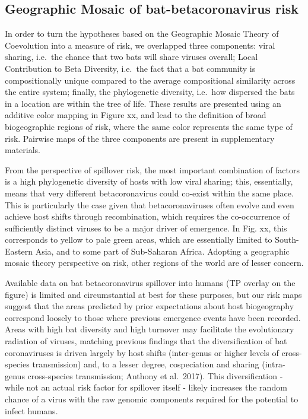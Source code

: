 \documentclass[11pt]{article}
\begin{document}
\hypertarget{geographic-mosaic-of-bat-betacoronavirus-risk}{%
\subsection{Geographic Mosaic of bat-betacoronavirus
risk}\label{geographic-mosaic-of-bat-betacoronavirus-risk}}

In order to turn the hypotheses based on the Geographic Mosaic Theory of
Coevolution into a measure of risk, we overlapped three components:
viral sharing, i.e.~the chance that two bats will share viruses overall;
Local Contribution to Beta Diversity, i.e.~the fact that a bat community
is compositionally unique compared to the average compositional
similarity across the entire system; finally, the phylogenetic
diversity, i.e.~how dispersed the bats in a location are within the tree
of life. These results are presented using an additive color mapping in
Figure xx, and lead to the definition of broad biogeographic regions of
risk, where the same color represents the same type of risk. Pairwise
maps of the three components are present in supplementary materials.

From the perspective of spillover risk, the most important combination
of factors is a high phylogenetic diversity of hosts with low viral
sharing; this, essentially, means that very different betacoronavirus
could co-exist within the same place. This is particularly the case
given that betacoronaviruses often evolve and even achieve host shifts
through recombination, which requires the co-occurrence of sufficiently
distinct viruses to be a major driver of emergence. In Fig. xx, this
corresponds to yellow to pale green areas, which are essentially limited
to South-Eastern Asia, and to some part of Sub-Saharan Africa. Adopting
a geographic mosaic theory perspective on risk, other regions of the
world are of lesser concern.

Available data on bat betacoronavirus spillover into humans (TP overlay
on the figure) is limited and circumstantial at best for these purposes,
but our risk maps suggest that the areas predicted by prior expectations
about host biogeography correspond loosely to those where previous
emergence events have been recorded. Areas with high bat diversity and
high turnover may facilitate the evolutionary radiation of viruses,
matching previous findings that the diversification of bat coronaviruses
is driven largely by host shifts (inter-genus or higher levels of
cross-species transmission) and, to a lesser degree, cospeciation and
sharing (intra-genus cross-species transmission; Anthony et al.~2017).
This diversification - while not an actual risk factor for spillover
itself - likely increases the random chance of a virus with the raw
genomic components required for the potential to infect humans.
\end{document}
